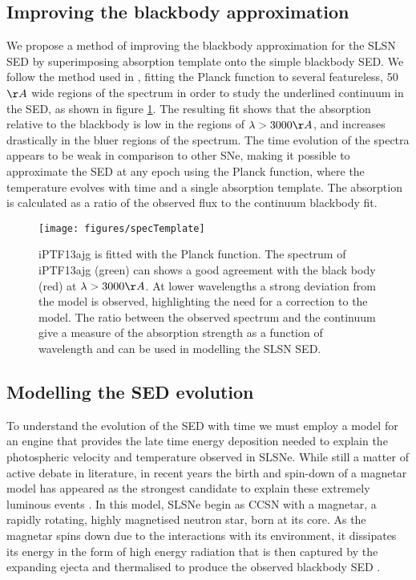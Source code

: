 \subsection{Improving the blackbody approximation}
We propose a method of improving the blackbody approximation for the SLSN SED by superimposing absorption template onto the simple blackbody SED. We follow the method used in \cite{2014ApJ...797...24V}, fitting the Planck function to several featureless, 50$\AA$ wide regions of the spectrum in order to study the underlined continuum in the SED, as shown in figure \ref{fig:specTemplate}. The resulting fit shows that the absorption relative to the blackbody is low in the regions of $\lambda>3000\AA$, and increases drastically in the bluer regions of the spectrum. The time evolution of the spectra appears to be weak in comparison to other SNe, making it possible to approximate the SED at any epoch using the Planck function, where the temperature evolves with time and a single absorption template. The absorption is calculated as a ratio of the observed flux to the continuum blackbody fit.
\begin{figure}
\centering
\texttt{[image: figures/specTemplate]}
\caption{iPTF13ajg is fitted with the Planck function. The spectrum of iPTF13ajg (green) can shows a good agreement with the black body (red) at $\lambda>3000\AA$. At lower wavelengths a strong deviation from the model is observed, highlighting the need for a correction to the model. The ratio between the observed spectrum and the continuum give a measure of the absorption strength as a function of wavelength and can be used in modelling the SLSN SED.}
\label{fig:specTemplate}
\end{figure}

\subsection{Modelling the SED evolution}
\label{sec:Magnetar}
To understand the evolution of the SED with time we must employ a model for an engine that provides the late time energy deposition needed to explain the photospheric velocity and temperature observed in SLSNe. While still a matter of active debate in literature, in recent years the birth and spin-down of a magnetar model has appeared as the strongest candidate to explain these extremely luminous events \citep{2013ApJ...770..128I,2013Natur.502..346N}. In this model, SLSNe begin as CCSN with a magnetar, a rapidly rotating, highly magnetised neutron star, born at its core. As the magnetar spins down due to the interactions with its environment, it dissipates its energy in the form of high energy radiation that is then captured by the expanding ejecta and thermalised to produce the observed blackbody SED \citep{2010ApJ...717..245K,2010ApJ...719L.204W,2012MNRAS.426L..76D}.

